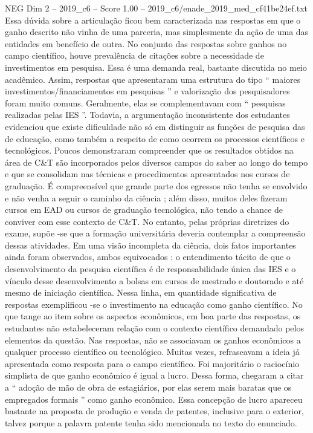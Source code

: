 \begin{textsample}{NEG Dim 2 – 2019\_c6 – Score 1.00 – 2019\_c6/enade\_2019\_med\_cf41be24ef.txt}
Essa dúvida sobre a articulação ficou bem caracterizada nas respostas em que o ganho descrito não vinha de uma parceria, mas simplesmente da ação de uma das entidades em benefício de outra.
No conjunto das respostas sobre ganhos no campo científico, houve prevalência de citações sobre a necessidade de investimentos em pesquisa.
Essa é uma demanda real, bastante discutida no meio acadêmico.
Assim, respostas que apresentaram uma estrutura do tipo “ maiores investimentos/financiamentos em pesquisas ” e valorização dos pesquisadores foram muito comuns.
Geralmente, elas se complementavam com “ pesquisas realizadas pelas IES ”.
Todavia, a argumentação inconsistente dos estudantes evidenciou que existe dificuldade não só em distinguir as funções de pesquisa das de educação, como também a respeito de como ocorrem os processos científicos e tecnológicos.
Poucos demonstraram compreender que os resultados obtidos na área de C\&T são incorporados pelos diversos campos do saber ao longo do tempo e que se consolidam nas técnicas e procedimentos apresentados nos cursos de graduação.
É compreensível que grande parte dos egressos não tenha se envolvido e não venha a seguir o caminho da ciência ; além disso, muitos deles fizeram cursos em EAD ou cursos de graduação tecnológica, não tendo a chance de conviver com esse contexto de C\&T.
No entanto, pelas próprias diretrizes do exame, supõe -se que a formação universitária deveria contemplar a compreensão dessas atividades.
Em uma visão incompleta da ciência, dois fatos importantes ainda foram observados, ambos equivocados : o entendimento tácito de que o desenvolvimento da pesquisa científica é de responsabilidade única das IES e o vínculo desse desenvolvimento a bolsas em cursos de mestrado e doutorado e até mesmo de iniciação científica.
Nessa linha, em quantidade significativa de respostas exemplificou -se o investimento na educação como ganho científico.
No que tange ao item sobre os aspectos econômicos, em boa parte das respostas, os estudantes não estabeleceram relação com o contexto científico demandado pelos elementos da questão.
Nas respostas, não se associavam os ganhos econômicos a qualquer processo científico ou tecnológico.
Muitas vezes, refraseavam a ideia já apresentada como resposta para o campo científico.
Foi majoritário o raciocínio simplista de que ganho econômico é igual a lucro.
Dessa forma, chegaram a citar a “ adoção de mão de obra de estagiários, por elas serem mais baratas que os empregados formais ” como ganho econômico.
Essa concepção de lucro apareceu bastante na proposta de produção e venda de patentes, inclusive para o exterior, talvez porque a palavra patente tenha sido mencionada no texto do enunciado.

\end{textsample}
